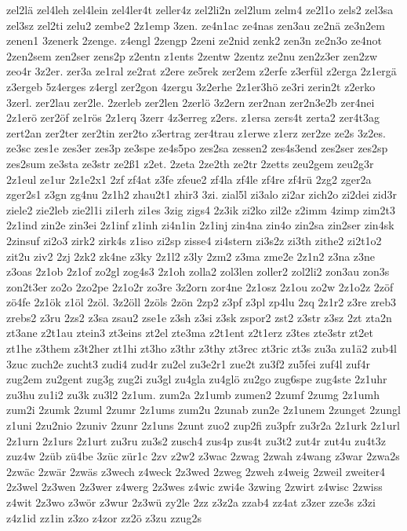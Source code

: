 {zel2lä
zel4leh
zel4lein
zel4ler4t
zeller4z
zel2li2n
zel2lum
zelm4
ze2l1o
zels2
zel3sa
zel3sz
zel2ti
zelu2
zembe2
2z1emp
3zen.
ze4n1ac
ze4nas
zen3au
ze2nä
ze3n2em
zenen1
3zenerk
2zenge.
z4engl
2zengp
2zeni
ze2nid
zenk2
zen3n
ze2n3o
ze4not
2zen2sem
zen2ser
zens2p
z2entn
z1ents
2zentw
2zentz
ze2nu
zen2z3er
zen2zw
zeo4r
3z2er.
zer3a
ze1ral
ze2rat
z2ere
ze5rek
zer2em
z2erfe
z3erfül
z2erga
2z1ergä
z3ergeb
5z4erges
z4ergl
zer2gon
4zergu
3z2erhe
2z1er3hö
ze3ri
zerin2t
z2erko
3zerl.
zer2lau
zer2le.
2zerleb
zer2len
2zerlö
3z2ern
zer2nan
zer2n3e2b
zer4nei
2z1erö
zer2öf
ze1rös
2z1erq
3zerr
4z3erreg
z2ers.
z1ersa
zers4t
zerta2
zer4t3ag
zert2an
zer2ter
zer2tin
zer2to
z3ertrag
zer4trau
z1erwe
z1erz
zer2ze
ze2s
3z2es.
ze3sc
zes1e
zes3er
zes3p
ze3spe
ze4s5po
zes2sa
zessen2
zes4s3end
zes2ser
zes2sp
zes2sum
ze3sta
ze3str
ze2ß1
z2et.
2zeta
2ze2th
ze2tr
2zetts
zeu2gem
zeu2g3r
2z1eul
ze1ur
2z1e2x1
2zf
zf4at
z3fe
zfeue2
zf4la
zf4le
zf4re
zf4rü
2zg2
zger2a
zger2s1
z3gn
zg4nu
2z1h2
zhau2t1
zhir3
3zi.
zial5l
zi3alo
zi2ar
zich2o
zi2dei
zid3r
ziele2
zie2leb
zie2l1i
zi1erh
zi1es
3zig
zigs4
2z3ik
zi2ko
zil2e
z2imm
4zimp
zim2t3
2z1ind
zin2e
zin3ei
2z1inf
z1inh
zi4n1in
2z1inj
zin4na
zin4o
zin2sa
zin2ser
zin4sk
2zinsuf
zi2o3
zirk2
zirk4s
z1iso
zi2sp
zisse4
zi4stern
zi3s2z
zi3th
zithe2
zi2t1o2
zit2u
ziv2
2zj
2zk2
zk4ne
z3ky
2z1l2
z3ly
2zm2
z3ma
zme2e
2z1n2
z3na
z3ne
z3oas
2z1ob
2z1of
zo2gl
zog4s3
2z1oh
zolla2
zol3len
zoller2
zol2li2
zon3au
zon3s
zon2t3er
zo2o
2zo2pe
2z1o2r
zo3re
3z2orn
zor4ne
2z1osz
2z1ou
zo2w
2z1o2z
2zöf
zö4fe
2z1ök
z1öl
2zöl.
3z2öll
2zöls
2zön
2zp2
z3pf
z3pl
zp4lu
2zq
2z1r2
z3re
zreb3
zrebs2
z3ru
2zs2
z3sa
zsau2
zse1e
z3sh
z3si
z3sk
zspor2
zst2
z3str
z3sz
2zt
zta2n
zt3ane
z2t1au
ztein3
zt3eins
zt2el
zte3ma
z2t1ent
z2t1erz
z3tes
zte3str
zt2et
zt1he
z3them
z3t2her
zt1hi
zt3ho
z3thr
z3thy
zt3rec
zt3ric
zt3s
zu3a
zu1ä2
zub4l
3zuc
zuch2e
zucht3
zudi4
zud4r
zu2el
zu3e2r1
zue2t
zu3f2
zu5fei
zuf4l
zuf4r
zug2em
zu2gent
zug3g
zug2i
zu3gl
zu4gla
zu4glö
zu2go
zug6spe
zug4ste
2z1uhr
zu3hu
zu1i2
zu3k
zu3l2
2z1um.
zum2a
2z1umb
zumen2
2zumf
2zumg
2z1umh
zum2i
2zumk
2zuml
2zumr
2z1ums
zum2u
2zunab
zun2e
2z1unem
2zunget
2zungl
z1uni
2zu2nio
2zuniv
2zunr
2z1uns
2zunt
zuo2
zup2fi
zu3pfr
zu3r2a
2z1urk
2z1url
2z1urn
2z1urs
2z1urt
zu3ru
zu3s2
zusch4
zus4p
zus4t
zu3t2
zut4r
zut4u
zu4t3z
zuz4w
2züb
zü4be
3züc
zür1c
2zv
z2w2
z3wac
2zwag
2zwah
z4wang
z3war
2zwa2s
2zwäc
2zwär
2zwäs
z3wech
z4weck
2z3wed
2zweg
2zweh
z4weig
2zweil
zweiter4
2z3wel
2z3wen
2z3wer
z4werg
2z3wes
z4wic
zwi4e
3zwing
2zwirt
z4wisc
2zwiss
z4wit
2z3wo
z3wör
z3wur
2z3wü
zy2le
2zz
z3z2a
zzab4
zz4at
z3zer
zze3s
z3zi
z4z1id
zz1in
z3zo
z4zor
zz2ö
z3zu
zzug2s
}

\endinput

